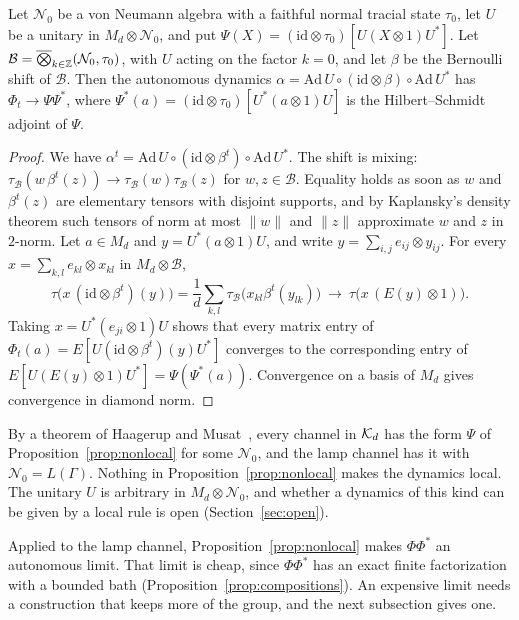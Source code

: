 \begin{proposition}\label{prop:nonlocal}
Let $\mathcal N_0$ be a von Neumann algebra with a faithful normal tracial state $\tau_0$, let $U$ be a unitary in $M_d\otimes\mathcal N_0$, and put
$\Psi(X)=(\mathrm{id}\otimes\tau_0)[U(X\otimes1)U^*]$. Let $\mathcal B=\overline\bigotimes_{k\in\mathbb Z}(\mathcal N_0,\tau_0)$, with $U$ acting on the factor
$k=0$, and let $\beta$ be the Bernoulli shift of $\mathcal B$. Then the autonomous dynamics $\alpha=\mathrm{Ad}\,U\circ(\mathrm{id}\otimes\beta)\circ\mathrm{Ad}\,U^*$
has $\Phi_t\to\Psi\Psi^*$, where $\Psi^*(a)=(\mathrm{id}\otimes\tau_0)[U^*(a\otimes1)U]$ is the Hilbert--Schmidt adjoint of $\Psi$.
\end{proposition}

\begin{proof}
We have $\alpha^t=\mathrm{Ad}\,U\circ(\mathrm{id}\otimes\beta^t)\circ\mathrm{Ad}\,U^*$. The shift is mixing: $\tau_{\mathcal B}(w\,\beta^t(z))\to\tau_{\mathcal B}(w)\tau_{\mathcal B}(z)$ for
$w,z\in\mathcal B$. Equality holds as soon as $w$ and $\beta^t(z)$ are elementary tensors with disjoint supports, and by Kaplansky's density
theorem such tensors of norm at most $\|w\|$ and $\|z\|$ approximate $w$ and $z$ in $2$-norm. Let $a\in M_d$ and $y=U^*(a\otimes1)U$, and write
$y=\sum_{i,j}e_{ij}\otimes y_{ij}$. For every $x=\sum_{k,l}e_{kl}\otimes x_{kl}$ in $M_d\otimes\mathcal B$,
\[
\tau\bigl(x\,(\mathrm{id}\otimes\beta^t)(y)\bigr)=\frac1d\sum_{k,l}\tau_{\mathcal B}\bigl(x_{kl}\beta^t(y_{lk})\bigr)\ \longrightarrow\ \tau\bigl(x\,(E(y)\otimes1)\bigr).
\]
Taking $x=U^*(e_{ji}\otimes1)U$ shows that every matrix entry of $\Phi_t(a)=E[U(\mathrm{id}\otimes\beta^t)(y)U^*]$ converges to the corresponding entry
of $E[U(E(y)\otimes1)U^*]=\Psi(\Psi^*(a))$. Convergence on a basis of $M_d$ gives convergence in diamond norm.
\end{proof}

By a theorem of Haagerup and Musat~\cite[Theorem~3.6]{HaagerupMusat2015}, every channel in $\mathcal K_d$ has the form $\Psi$ of
Proposition~\ref{prop:nonlocal} for some $\mathcal N_0$, and the lamp channel has it with $\mathcal N_0=L(\Gamma)$. Nothing in
Proposition~\ref{prop:nonlocal} makes the dynamics local. The unitary $U$ is arbitrary in $M_d\otimes\mathcal N_0$, and whether a dynamics of
this kind can be given by a local rule is open (Section~\ref{sec:open}).

Applied to the lamp channel, Proposition~\ref{prop:nonlocal} makes $\Phi\Phi^*$ an autonomous limit. That limit is cheap, since $\Phi\Phi^*$
has an exact finite factorization with a bounded bath (Proposition~\ref{prop:compositions}). An expensive limit needs a construction that keeps
more of the group, and the next subsection gives one.


